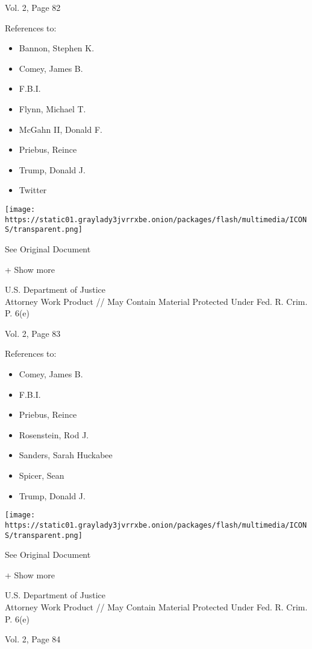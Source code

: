 Vol. 2, Page 82

References to:

\begin{itemize}
\tightlist
\item
  Bannon, Stephen K.
\item
  Comey, James B.
\item
  F.B.I.
\item
  Flynn, Michael T.
\item
  McGahn II, Donald F.
\item
  Priebus, Reince
\item
  Trump, Donald J.
\item
  Twitter
\end{itemize}

\protect\hyperlink{}{}

\texttt{[image: https://static01.graylady3jvrrxbe.onion/packages/flash/multimedia/ICONS/transparent.png]}

See Original Document

+ Show more

U.S. Department of Justice\\
Attorney Work Product // May Contain Material Protected Under Fed. R.
Crim. P. 6(e)

Vol. 2, Page 83

References to:

\begin{itemize}
\tightlist
\item
  Comey, James B.
\item
  F.B.I.
\item
  Priebus, Reince
\item
  Rosenstein, Rod J.
\item
  Sanders, Sarah Huckabee
\item
  Spicer, Sean
\item
  Trump, Donald J.
\end{itemize}

\protect\hyperlink{}{}

\texttt{[image: https://static01.graylady3jvrrxbe.onion/packages/flash/multimedia/ICONS/transparent.png]}

See Original Document

+ Show more

U.S. Department of Justice\\
Attorney Work Product // May Contain Material Protected Under Fed. R.
Crim. P. 6(e)

Vol. 2, Page 84

